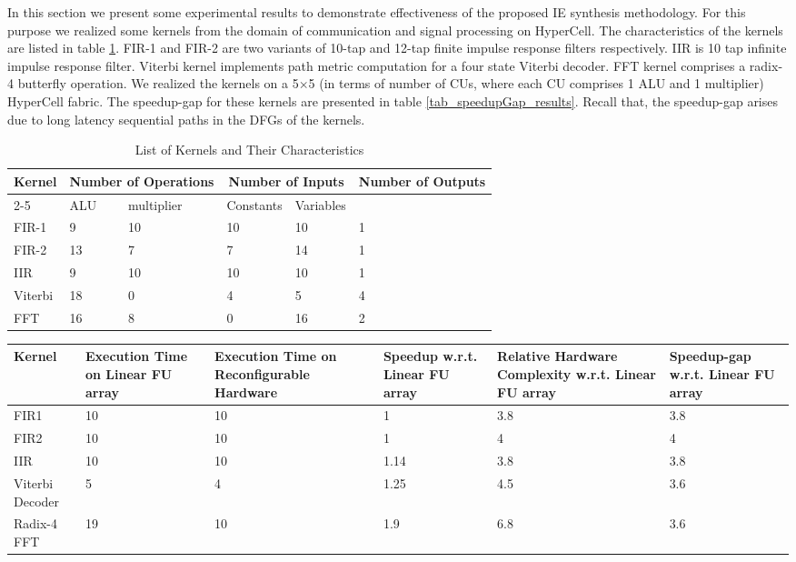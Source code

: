 In this section we present some experimental results to demonstrate effectiveness of the proposed IE synthesis methodology. For this purpose we realized some kernels from the domain of communication and signal processing on HyperCell. The characteristics of the kernels are listed in table \ref{tab_list_kernel}.
FIR-1 and FIR-2 are two variants of 10-tap and 12-tap finite impulse response filters respectively. IIR is 10 tap infinite impulse response filter. Viterbi kernel implements path metric computation for a four state Viterbi decoder.
FFT kernel comprises a radix-4 butterfly operation.
We realized the kernels on a 5$\times$5 (in terms of number of CUs, where each CU comprises 1 ALU and 1 multiplier) HyperCell fabric. The speedup-gap for these kernels are presented in table \ref{tab_speedupGap_results}. Recall that, the speedup-gap arises due to long latency sequential paths in the DFGs of the kernels.
\begin{table}[htp]
\caption{List of Kernels and Their Characteristics}
\label{tab_list_kernel}
\centering
    \begin{tabular}{|p{1cm} | p{1cm} | p{1cm} | p{0.9cm}| p{0.9cm}| p{1.4cm}|}
    \hline
      Kernel & \multicolumn{2}{|c|}{Number of Operations}  & \multicolumn{2}{|c|}{Number of Inputs} & Number of Outputs\\ 
	\cline{2-5} 	 & ALU  	& multiplier & Constants & Variables  & \\\hline \hline
      FIR-1   & 9 & 10 & 10 & 10 & 1\\ \hline
      FIR-2   & 13 & 7 & 7 & 14 & 1\\ \hline
      IIR     & 9 & 10 & 10 & 10 & 1\\ \hline
      Viterbi & 18 & 0 & 4 & 5 & 4\\ \hline
      FFT     & 16 & 8 & 0 & 16 & 2\\ \hline
     \end{tabular}
\end{table}
\begin{table*}[ht]
\caption{Speedup-gap of Some Kernels}
\label{tab_speedupGap_results}
\centering
    \begin{tabular}{|p{1 in}| p{0.8 in}|p{1 in} |p{1 in}| p{1.4 in} |p{1 in}|}
    \hline
	Kernel & Execution Time on Linear FU array & Execution Time on Reconfigurable Hardware & Speedup w.r.t. Linear FU array & Relative Hardware Complexity w.r.t. Linear FU array & Speedup-gap w.r.t. Linear FU array\\ \hline \hline
	FIR1 & 10 & 10 &  1 & 3.8 & 3.8\\ \hline
	FIR2 & 10 & 10 & 1 & 4 & 4\\ \hline
	IIR & 10 & 10 & 1.14 & 3.8 & 3.8\\ \hline
	Viterbi Decoder & 5 & 4 &  1.25 & 4.5 & 3.6\\ \hline
	Radix-4 FFT  & 19 & 10 & 1.9 & 6.8 & 3.6\\ \hline
    \end{tabular}
\end{table*}


